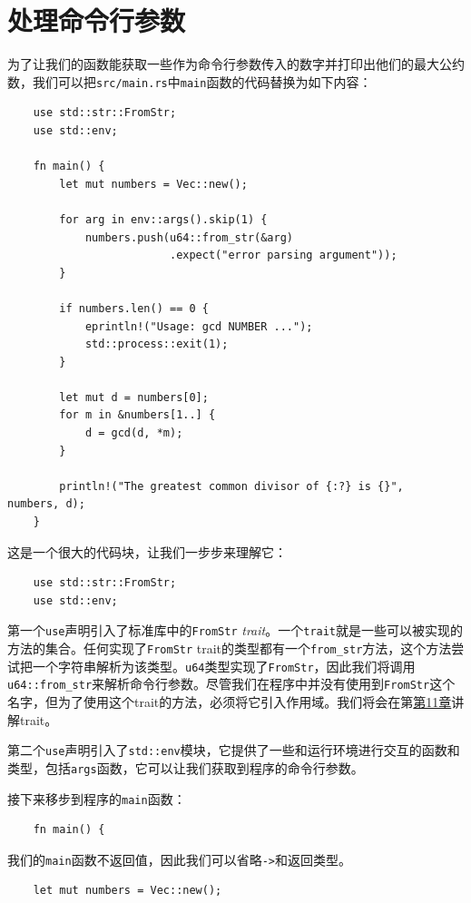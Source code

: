 \section{处理命令行参数}
为了让我们的函数能获取一些作为命令行参数传入的数字并打印出他们的最大公约数，我们可以把\texttt{src/main.rs}中\texttt{main}函数的代码替换为如下内容：
\begin{verbatim}
    use std::str::FromStr;
    use std::env;

    fn main() {
        let mut numbers = Vec::new();

        for arg in env::args().skip(1) {
            numbers.push(u64::from_str(&arg)
                         .expect("error parsing argument"));
        }

        if numbers.len() == 0 {
            eprintln!("Usage: gcd NUMBER ...");
            std::process::exit(1);
        }

        let mut d = numbers[0];
        for m in &numbers[1..] {
            d = gcd(d, *m);
        }

        println!("The greatest common divisor of {:?} is {}",   numbers, d);
    }
\end{verbatim}

这是一个很大的代码块，让我们一步步来理解它：
\begin{verbatim}
    use std::str::FromStr;
    use std::env;
\end{verbatim}

第一个\texttt{use}声明引入了标准库中的\texttt{FromStr} \emph{trait}。一个\texttt{trait}就是一些可以被实现的方法的集合。任何实现了\texttt{FromStr} trait的类型都有一个\texttt{from\_str}方法，这个方法尝试把一个字符串解析为该类型。\texttt{u64}类型实现了\texttt{FromStr}，因此我们将调用\texttt{u64::from\_str}来解析命令行参数。尽管我们在程序中并没有使用到\texttt{FromStr}这个名字，但为了使用这个trait的方法，必须将它引入作用域。我们将会在第\hyperref[ch11]{第11章}讲解trait。

第二个\texttt{use}声明引入了\texttt{std::env}模块，它提供了一些和运行环境进行交互的函数和类型，包括\texttt{args}函数，它可以让我们获取到程序的命令行参数。

接下来移步到程序的\texttt{main}函数：
\begin{verbatim}
    fn main() {
\end{verbatim}

我们的\texttt{main}函数不返回值，因此我们可以省略\texttt{->}和返回类型。

\begin{verbatim}
    let mut numbers = Vec::new();
\end{verbatim}

